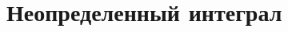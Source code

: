 \documentclass[../main.tex]{subfiles}
\begin{document}
\chapter{Неопределенный интеграл}


\end{document}
